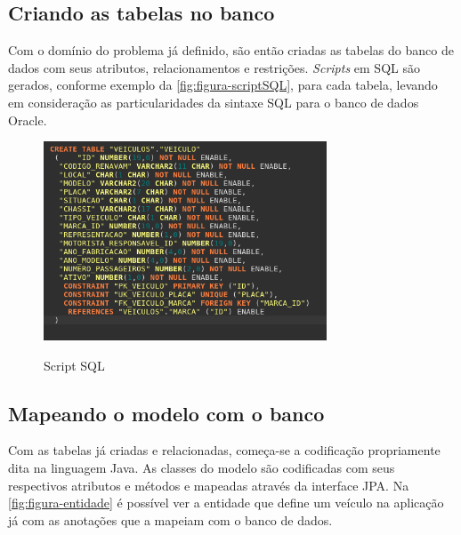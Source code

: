 \subsection{Criando as tabelas no banco}
\label{sbs:desenvolvimentoTabelas}

Com o domínio do problema já definido, são então criadas as tabelas do banco de dados com seus atributos, relacionamentos e restrições.
\textit{Scripts} em SQL são gerados, conforme exemplo da \autoref{fig:figura-scriptSQL}, para cada tabela, levando em consideração as particularidades da sintaxe SQL para o banco de dados Oracle. 

\begin{figure}[!htb]
    \centering
    \caption{Script SQL}
    \includegraphics[width=0.75\textwidth]{dados/figuras/scriptSQL.png}
    \label{fig:figura-scriptSQL}
\end{figure}

\subsection{Mapeando o modelo com o banco}
\label{sbs:desenvolvimentoMapeamento}

Com as tabelas já criadas e relacionadas, começa-se a codificação propriamente dita na linguagem Java. As classes do modelo são codificadas com seus respectivos atributos e métodos e mapeadas através da interface JPA. Na \autoref{fig:figura-entidade} é possível ver a entidade que define um veículo na aplicação já com as anotações que a mapeiam com o banco de dados.

